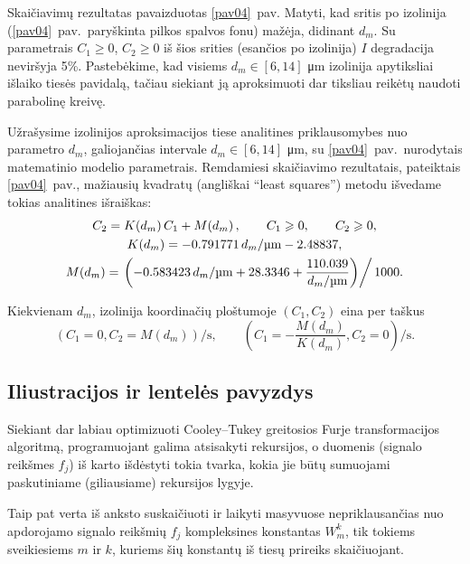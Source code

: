 \documentclass[a4paper,12pt]{article}
\begin{document}
Skaičiavimų rezultatas pavaizduotas \ref{pav04}~pav.
Matyti, kad sritis po izolinija (\ref{pav04}~pav.\ paryškinta pilkos spalvos fonu) mažėja, didinant $d_m$.
Su parametrais $C_1\geqslant 0$, $C_2\geqslant 0$ iš šios srities (esančios po izolinija) $I$ degradacija neviršyja 5\%.
Pastebėkime, kad visiems $d_m\in [6,14]$ \si{\micro\metre} izolinija apytiksliai išlaiko tiesės pavidalą,
tačiau siekiant ją aproksimuoti dar tiksliau reikėtų naudoti parabolinę kreivę.

Užrašysime izolinijos aproksimacijos tiese analitines priklausomybes nuo parametro $d_m$, galiojančias intervale $d_m\in [6,14]$ \si{\micro\metre},
su \ref{pav04}~pav.\ nurodytais matematinio modelio parametrais.
Remdamiesi skaičiavimo rezultatais, pateiktais \ref{pav04}~pav., mažiausių kvadratų (angliškai ``least squares'') metodu išvedame tokias analitines išraiškas:
\begin{gather}
    C_2  =  K\!\left( d_m \right) C_1  +  M\!\left( d_m \right), \qquad C_1 \geqslant 0, \qquad C_2 \geqslant 0,
    \label{TiesineAproksimacijaAtzvilgiu_dm}\\
    K\!\left( d_m \right)  =  -0.791771\, d_m / \si{\micro\metre}  -  2.48837,
    \label{TiesineAproksimacijaAtzvilgiu_dm_K}\\
    M\!\left( d_m \right)  =  \left. \left( -0.583423\, d_m / \si{\micro\metre}  +  28.3346  +  \frac{110.039}{d_m / \si{\micro\metre}} \right) \right/ 1000.
    \label{TiesineAproksimacijaAtzvilgiu_dm_M}
\end{gather}

Kiekvienam $d_m$, izolinija koordinačių ploštumoje $\left( C_1, C_2 \right)$ eina per taškus
\[
    \left( C_1 = 0, C_2 = M\!\left( d_m \right) \right) \si{\per\second}, \qquad
    \left( C_1 = -\frac{M\!\left( d_m \right)}{K\!\left( d_m \right)}, C_2 = 0 \right) \si{\per\second}.
\]

\subsection{Iliustracijos ir lentelės pavyzdys}

Siekiant dar labiau optimizuoti Cooley--Tukey greitosios Furje transformacijos algoritmą, programuojant galima atsisakyti rekursijos,
o duomenis (signalo reikšmes $f_j$) iš karto išdėstyti tokia tvarka, kokia jie būtų sumuojami paskutiniame (giliausiame) rekursijos lygyje.

Taip pat verta iš anksto suskaičiuoti ir laikyti masyvuose nepriklausančias nuo apdorojamo signalo reikšmių $f_j$ kompleksines konstantas $W_m^{k}$,
tik tokiems sveikiesiems $m$ ir $k$, kuriems šių konstantų iš tiesų prireiks skaičiuojant.
\end{document}
